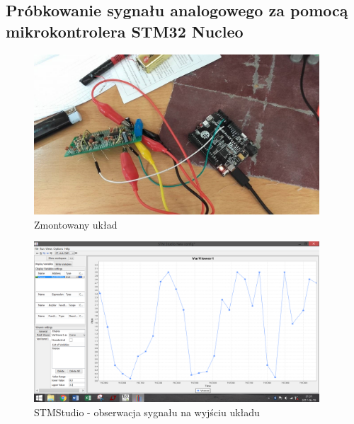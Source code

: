 \documentclass[12pt]{article}
\begin{document}
\subsection{Próbkowanie sygnału analogowego za pomocą mikrokontrolera STM32 Nucleo}
\begin{figure}[H]
\begin{center}
\includegraphics[width=0.95\textwidth]{figures/uklad.png}
\caption{Zmontowany układ}
\end{center}
\end{figure}
\begin{figure}[H]
\begin{center}
\includegraphics[width=0.95\textwidth]{figures/stm.png}
\caption{STMStudio - obserwacja sygnału na wyjściu układu}
\end{center}
\end{figure}
%

\newpage
\end{document}
